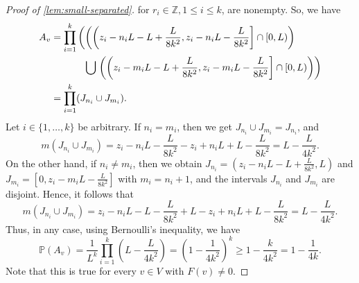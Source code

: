 \documentclass[12pt,a4paper,bold]{thesis}
\theoremstyle{definition}
\begin{document}
\begin{proof}[Proof of \cref{lem:small-separated}]
    for $r_i \in \mathbb{Z}, 1 \leq i \leq k$, are nonempty. So, we have
    \begin{align*}
        A_v & =
        \prod_{i=1}^{k} \left(\left(\left(z_i - n_iL - L + \frac{L}{8k^2}, 
        z_i - n_iL - \frac{L}{8k^2}\right] \cap [0,L)\right)\right.
        \\
        & \hspace{1.2cm} 
        \bigcup \left.\left(\left(z_i - m_iL - L + \frac{L}{8k^2}, 
        z_i - m_iL - \frac{L}{8k^2}\right] \cap [0,L)\right)\right)
        \\
        & =
        \prod_{i=1}^{k} (J_{n_i} \cup J_{m_i}).
    \end{align*}
    Let $i \in \{1, \dots, k\}$ be arbitrary. If $n_i = m_i$, then we get 
    $J_{n_i} \cup J_{m_i} = J_{n_i}$, and 
    \begin{equation*}
        m(J_{n_i} \cup J_{m_i}) = z_i - n_iL - \frac{L}{8k^2} - z_i + n_iL + L - \frac{L}{8k^2} 
        = L - \frac{L}{4k^2}.
    \end{equation*}
    On the other hand, 
    if $n_i \neq m_i$, then we obtain $J_{n_i} = \left(z_i - n_iL - L + \frac{L}{8k^2},
    L\right)$ and $J_{m_i} = \left[0, z_i - m_iL - \frac{L}{8k^2}\right]$ with
    $m_i = n_i + 1$, and the intervals $J_{n_i}$ and $J_{m_i}$ are disjoint. 
    Hence, it follows that
    \begin{equation*}
        m(J_{n_i} \cup J_{m_i}) 
        = z_i - n_iL - L - \frac{L}{8k^2} + L - z_i + n_iL + L - \frac{L}{8k^2}
        = L - \frac{L}{4k^2}.
    \end{equation*}
    Thus, in any case, using Bernoulli's inequality, we have
    \begin{equation*}
        \mathbb{P}(A_v) 
        = \frac{1}{L^k} \prod_{i=1}^k \left(L - \frac{L}{4k^2}\right)
        = \left(1 - \frac{1}{4k^2}\right)^k \geq 1 - \frac{k}{4k^2}
    	= 1 - \frac{1}{4k}.
    \end{equation*}
    Note that this is true for every $v \in V$ with $F(v) \neq 0$.
    

\end{proof}
\end{document}
